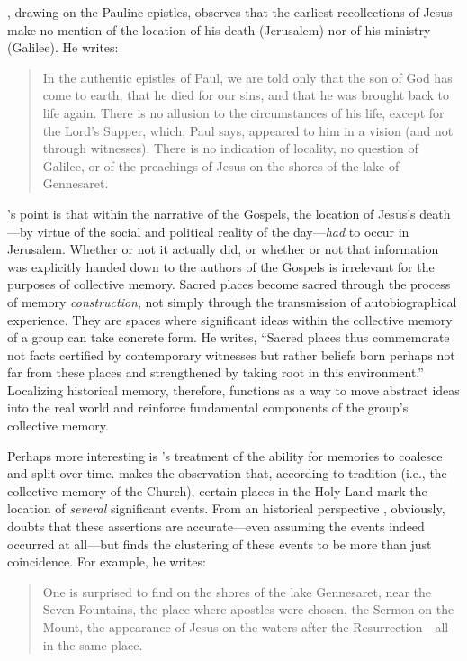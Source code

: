\halbwachs, drawing on the Pauline epistles, observes
that the earliest recollections of Jesus make no mention of the location
of his death (Jerusalem) nor of his ministry (Galilee). He writes:

\begin{quote}
In the authentic epistles of Paul, we are told only that the son of God
has come to earth, that he died for our sins, and that he was brought
back to life again. There is no allusion to the circumstances of his
life, except for the Lord's Supper, which, Paul says, appeared to him in
a vision (and not through witnesses). There is no indication of
locality, no question of Galilee, or of the preachings of Jesus on the
shores of the lake of Gennesaret.\autocite[209]{halbwachs1992}
\end{quote}

\halbwachs's point is that within the narrative of the
Gospels, the location of Jesus's death---by virtue of the social and
political reality of the day---\emph{had} to occur in
Jerusalem.\autocite[211]{halbwachs1992} Whether or not it actually did,
or whether or not that information was explicitly handed down to the
authors of the Gospels is irrelevant for the purposes of collective
memory. Sacred places become sacred through the process of memory
\emph{construction}, not simply through the transmission of
autobiographical experience. They are spaces where significant ideas
within the collective memory of a group can take concrete form. He
writes, ``Sacred places thus commemorate not facts certified by
contemporary witnesses but rather beliefs born perhaps not far from
these places and strengthened by taking root in this
environment.''\autocite[199]{halbwachs1992} Localizing historical
memory, therefore, functions as a way to move abstract ideas into the
real world and reinforce fundamental components of the group's
collective memory.

Perhaps more interesting is \halbwachs's treatment of
the ability for memories to coalesce and split over time.
\halbwachs makes the observation that, according to
tradition (i.e., the collective memory of the Church), certain places in
the Holy Land mark the location of \emph{several} significant events.
From an historical perspective \halbwachs, obviously,
doubts that these assertions are accurate---even assuming the events
indeed occurred at all---but finds the clustering of these events to be
more than just coincidence. For example, he writes:

\begin{quote}
One is surprised to find on the shores of the lake Gennesaret, near the
Seven Fountains, the place where apostles were chosen, the Sermon on the
Mount, the appearance of Jesus on the waters after the
Resurrection---all in the same place.\autocite[220]{halbwachs1992}
\end{quote}


